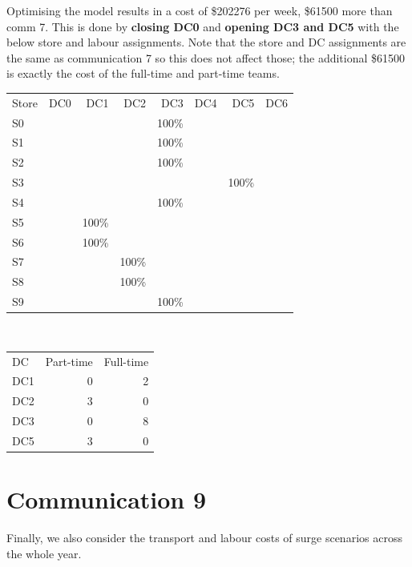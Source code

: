 \documentclass[11pt,a4paper]{article}
\begin{document}
Optimising the model results in a cost of \$202276 per week, \$61500 more than 
comm 7. This is done by \textbf{closing DC0} and 
\textbf{opening DC3 and DC5} with the below store and labour assignments. 
Note that the store and DC assignments are the same as 
communication 7 so this does not affect those; the additional \$61500
is exactly the cost of the full-time and part-time teams.
\\[0.8em]
\begin{tabular}{l  r  r  r  r r r r}
    Store & DC0 & DC1 & DC2 & DC3 & DC4 & DC5 & DC6 \\
    S0 &  &  &  & 100\% &  &  &  \\
    S1 &  &  &  & 100\% &  &  &  \\
    S2 &  &  &  & 100\% &  &  &  \\
    S3 &  &  &  &  &  & 100\% &  \\
    S4 &  &  &  & 100\% &  &  &  \\
    S5 &  & 100\% &  &  &  &  &  \\
    S6 &  & 100\% &  &  &  &  &  \\
    S7 &  &  & 100\% &  &  &  &  \\
    S8 &  &  & 100\% &  &  &  &  \\
    S9 &  &  &  & 100\% &  &  &  \\
\end{tabular} \\ [0.8em]
\begin{tabular}{l  r  r }
    DC & Part-time & Full-time \\
    DC1 & 0 &2 \\ 
    DC2  & 3 &0 \\ 
    DC3 &  0& 8 \\
    DC5 &  3&0 \\ 
\end{tabular}

\newpage
\section{Communication 9}
Finally, we also consider the transport and labour costs of 
surge scenarios across the whole year. 
\end{document}
